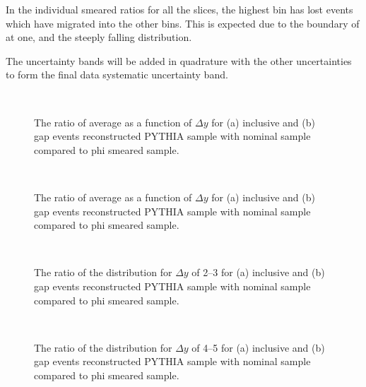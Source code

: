 In the \dphi{} individual smeared ratios for all the \dy{} slices, the highest \dphi{} bin has lost events which have migrated into the other \dphi{} bins. 
This is expected due to the boundary of \dphi{} at one, and the steeply falling \dphi{} distribution.

The uncertainty bands will be added in quadrature with the other uncertainties to form the final data systematic uncertainty band.

\begin{figure}
\centering
\mbox{
              \quad
              \quad
                              }
\caption[]{
The ratio of average \cosdphi{} as a function of $\Delta y$ for (a) inclusive and (b) gap events reconstructed PYTHIA sample with nominal sample compared to phi smeared sample.
\label{GBJ2:ResoPhi:cos}}
\end{figure}

\begin{figure}
\centering
\mbox{
              \quad
              \quad
                              }
\caption[]{
The ratio of average \costwodphi{} as a function of $\Delta y$ for (a) inclusive and (b) gap events reconstructed PYTHIA sample with nominal sample compared to phi smeared sample.
\label{GBJ2:ResoPhi:cos2}}
\end{figure}


\begin{figure}
\centering
\mbox{
              \quad
              \quad
                              }
\caption[]{
The ratio of the \dphi{} distribution for $\Delta y$ of 2--3 for (a) inclusive and (b) gap events reconstructed PYTHIA sample with nominal sample compared to phi smeared sample.
\label{GBJ2:ResoPhi:dphi23}}
\end{figure}


\begin{figure}
\centering
\mbox{
              \quad
              \quad
                              }
\caption[]{
The ratio of the \dphi{} distribution for $\Delta y$ of 4--5 for (a) inclusive and (b) gap events reconstructed PYTHIA sample with nominal sample compared to phi smeared sample.
\label{GBJ2:ResoPhi:dphi45}}
\end{figure}



